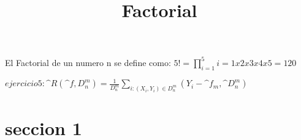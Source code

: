 \documentclass[a4paper]{article}
\title{Factorial}
\begin{document}
	\maketitle
El Factorial de un numero n se define como: $5! = \prod_{i=1}^{5} i = 1x2x3x4x5 = 120$


$ejercicio 5: \^{R}(\^{f},D^{m}_{n}) = \frac{1}{D^{m}_{n}} \sum_{i:(X_{i},Y_{i}) \in D_{n}^{m}}(Y_{i}- \^{f}_{m},\^{D}_{n}^{m}) $

\section{seccion 1}
\end{document}
